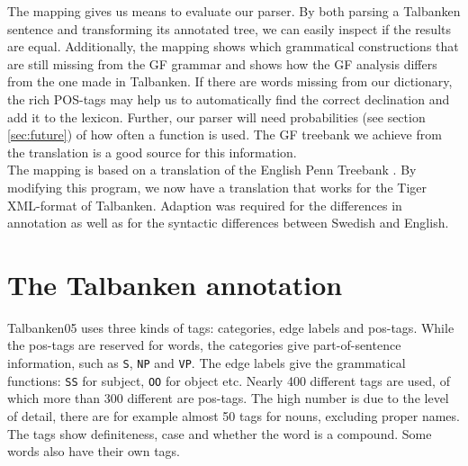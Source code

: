 \documentclass{report}
\begin{document}
The mapping %
gives us means to evaluate our parser. By both parsing a Talbanken sentence and
transforming its annotated tree, we can easily inspect if the results are
equal.
Additionally, the mapping shows which grammatical constructions that are still missing
from the GF grammar and shows how the GF analysis differs from the one made
in Talbanken.
If there are words missing from our dictionary, the rich
POS-tags may help us to automatically find the correct declination and add it to the
lexicon. Further, our parser will need probabilities (see section
\ref{sec:future}) of how often a function is used. The GF treebank we
achieve from the translation is a good source for this information.\\

The mapping is based on 
a translation of the English Penn Treebank \cite{gfpenn}.
By modifying this program, we now have a translation that works for
the Tiger XML-format of
Talbanken. Adaption was required for the differences in annotation as well as 
for the syntactic differences between Swedish and English.

\section{The Talbanken annotation}
Talbanken05 uses three kinds of tags: categories, edge labels and pos-tags. 
While the pos-tags are reserved for words, the categories give part-of-sentence information,
such as \verb|S|, \verb|NP| and \verb|VP|.
The edge labels give the grammatical functions: \verb|SS| for subject, 
\verb|OO| for object etc. Nearly 400 different tags are used, of which more than
300 different are pos-tags. The high number is due to the level of detail,  there are for
example almost 50 tags for nouns, excluding proper names. The tags
show definiteness, case and whether the word is a compound. Some words also have
their own tags.\\
\end{document}
